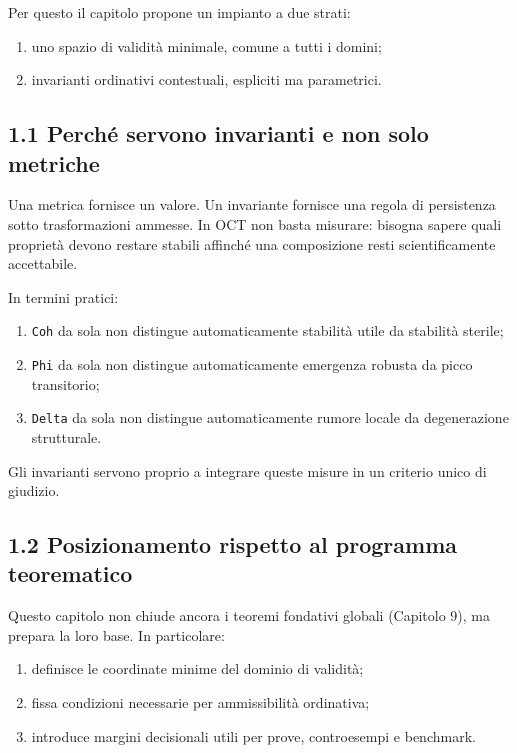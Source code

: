 Per questo il capitolo propone un impianto a due strati:

\begin{enumerate}
\def\labelenumi{\arabic{enumi}.}
\tightlist
\item
  uno spazio di validità minimale, comune a tutti i domini;
\item
  invarianti ordinativi contestuali, espliciti ma parametrici.
\end{enumerate}

\subsection{1.1 Perché servono invarianti e non solo metriche}

Una metrica fornisce un valore. Un invariante fornisce una regola di persistenza sotto trasformazioni ammesse. In OCT non basta misurare: bisogna sapere quali proprietà devono restare stabili affinché una composizione resti scientificamente accettabile.

In termini pratici:

\begin{enumerate}
\def\labelenumi{\arabic{enumi}.}
\tightlist
\item
  \texttt{Coh} da sola non distingue automaticamente stabilità utile da stabilità sterile;
\item
  \texttt{Phi} da sola non distingue automaticamente emergenza robusta da picco transitorio;
\item
  \texttt{Delta} da sola non distingue automaticamente rumore locale da degenerazione strutturale.
\end{enumerate}

Gli invarianti servono proprio a integrare queste misure in un criterio unico di giudizio.

\subsection{1.2 Posizionamento rispetto al programma teorematico}

Questo capitolo non chiude ancora i teoremi fondativi globali (Capitolo 9), ma prepara la loro base. In particolare:

\begin{enumerate}
\def\labelenumi{\arabic{enumi}.}
\tightlist
\item
  definisce le coordinate minime del dominio di validità;
\item
  fissa condizioni necessarie per ammissibilità ordinativa;
\item
  introduce margini decisionali utili per prove, controesempi e benchmark.
\end{enumerate}

